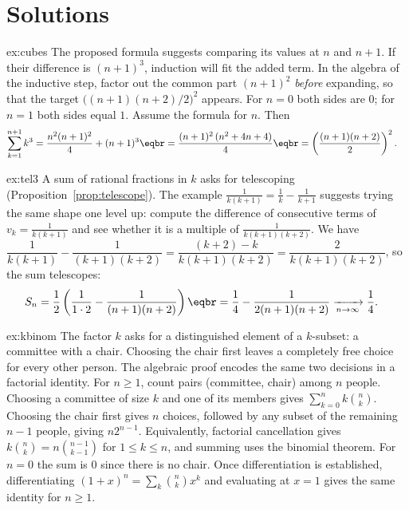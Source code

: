 \section{Solutions}

\begin{solution}{ex:cubes}
\idea The proposed formula suggests comparing its values at $n$ and $n+1$. If their difference is $(n+1)^3$, induction will fit the added term. In the algebra of the inductive step, factor out the common part $(n+1)^2$ \emph{before} expanding, so that the target $\bigl((n+1)(n+2)/2\bigr)^2$ appears.
\writeup For $n=0$ both sides are $0$; for $n=1$ both sides equal $1$. Assume the formula for $n$. Then
\[
\begin{aligned}\sum_{k=1}^{n+1}k^3&=\frac{n^2(n+1)^2}4+(n+1)^3\eqbr=\frac{(n+1)^2\,(n^2+4n+4)}4\eqbr=\left(\frac{(n+1)(n+2)}2\right)^2.\end{aligned}
\]
\end{solution}

\begin{solution}{ex:tel3}
\idea A sum of rational fractions in $k$ asks for telescoping (Proposition~\ref{prop:telescope}). The example $\frac1{k(k+1)}=\frac1k-\frac1{k+1}$ suggests trying the same shape one level up: compute the difference of consecutive terms of $v_k=\frac1{k(k+1)}$ and see whether it is a multiple of $\frac1{k(k+1)(k+2)}$.
\writeup We have $\dfrac1{k(k+1)}-\dfrac1{(k+1)(k+2)}=\dfrac{(k+2)-k}{k(k+1)(k+2)}=\dfrac2{k(k+1)(k+2)}$, so the sum telescopes:
\[
\begin{aligned}S_n&=\frac12\left(\frac1{1\cdot2}-\frac1{(n+1)(n+2)}\right)\eqbr=\frac14-\frac1{2(n+1)(n+2)}\xrightarrow[n\to\infty]{}\frac14.\end{aligned}
\]
\end{solution}

\begin{solution}{ex:kbinom}
\idea The factor $k$ asks for a distinguished element of a $k$-subset: a committee with a chair. Choosing the chair first leaves a completely free choice for every other person. The algebraic proof encodes the same two decisions in a factorial identity.
\writeup For $n\ge1$, count pairs (committee, chair) among $n$ people. Choosing a committee of size $k$ and one of its members gives $\sum_{k=0}^n k\binom nk$. Choosing the chair first gives $n$ choices, followed by any subset of the remaining $n-1$ people, giving $n2^{n-1}$. Equivalently, factorial cancellation gives $k\binom nk=n\binom{n-1}{k-1}$ for $1\le k\le n$, and summing uses the binomial theorem. For $n=0$ the sum is $0$ since there is no chair. Once differentiation is established, differentiating $(1+x)^n=\sum_k\binom nkx^k$ and evaluating at $x=1$ gives the same identity for $n\ge1$.
\end{solution}

